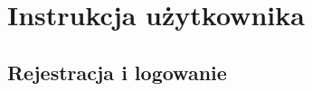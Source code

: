 \chapter{Instrukcja użytkownika}
\label{chap:instrukcja-uzytkownika}
\section{Rejestracja i logowanie}
